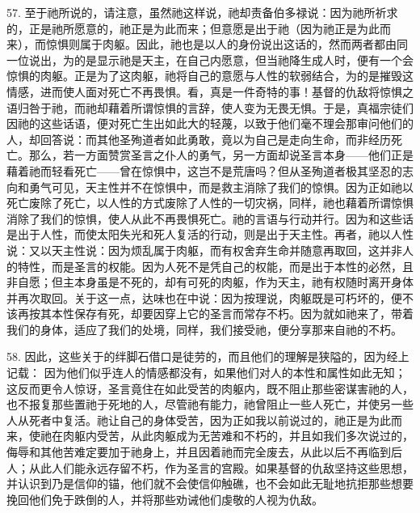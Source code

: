 57. 至于祂所说的，请注意，虽然祂这样说，祂却责备伯多禄说：因为祂所祈求的，正是祂所愿意的，祂正是为此而来；但意愿是出于祂（因为祂正是为此而来），而惊惧则属于肉躯。因此，祂也是以人的身份说出这话的，然而两者都由同一位说出，为的是显示祂是天主，在自己内愿意，但当祂降生成人时，便有一个会惊惧的肉躯。正是为了这肉躯，祂将自己的意愿与人性的软弱结合，为的是摧毁这情感，进而使人面对死亡不再畏惧。看，真是一件奇特的事！基督的仇敌将惊惧之语归咎于祂，而祂却藉着所谓惊惧的言辞，使人变为无畏无惧。于是，真福宗徒们因祂的这些话语，便对死亡生出如此大的轻蔑，以致于他们毫不理会那审问他们的人，却回答说：而其他圣殉道者如此勇敢，竟以为自己是走向生命，而非经历死亡。那么，若一方面赞赏圣言之仆人的勇气，另一方面却说圣言本身——他们正是藉着祂而轻看死亡——曾在惊惧中，这岂不是荒唐吗？但从圣殉道者极其坚忍的志向和勇气可见，天主性并不在惊惧中，而是救主消除了我们的惊惧。因为正如祂以死亡废除了死亡，以人性的方式废除了人性的一切灾祸，同样，祂也藉着所谓惊惧消除了我们的惊惧，使人从此不再畏惧死亡。祂的言语与行动并行。因为和这些话是出于人性，而使太阳失光和死人复活的行动，则是出于天主性。再者，祂以人性说：又以天主性说：因为烦乱属于肉躯，而有权舍弃生命并随意再取回，这并非人的特性，而是圣言的权能。因为人死不是凭自己的权能，而是出于本性的必然，且非自愿；但主本身虽是不死的，却有可死的肉躯，作为天主，祂有权随时离开身体并再次取回。关于这一点，达味也在中说：因为按理说，肉躯既是可朽坏的，便不该再按其本性保存有死，却要因穿上它的圣言而常存不朽。因为就如祂来了，带着我们的身体，适应了我们的处境，同样，我们接受祂，便分享那来自祂的不朽。\par

58. 因此，这些关于的绊脚石借口是徒劳的，而且他们的理解是狭隘的，因为经上记载： 因为他们似乎连人的情感都没有，如果他们对人的本性和属性如此无知；这反而更令人惊讶，圣言竟住在如此受苦的肉躯内，既不阻止那些密谋害祂的人，也不报复那些置祂于死地的人，尽管祂有能力，祂曾阻止一些人死亡，并使另一些人从死者中复活。祂让自己的身体受苦，因为正如我以前说过的，祂正是为此而来，使祂在肉躯内受苦，从此肉躯成为无苦难和不朽的，并且如我们多次说过的，侮辱和其他苦难定要加于祂身上，并且因着祂而完全废去，从此以后不再临到后人；从此人们能永远存留不朽，作为圣言的宫殿。如果基督的仇敌坚持这些思想，并认识到乃是信仰的锚，他们就不会使信仰触礁，也不会如此无耻地抗拒那些想要挽回他们免于跌倒的人，并将那些劝诫他们虔敬的人视为仇敌。\par

